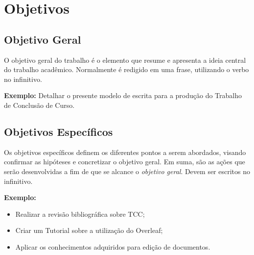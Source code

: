 \chapter{Objetivos}  \label{cap:02}



\section{Objetivo Geral}

O objetivo geral do trabalho é o elemento que resume e apresenta a ideia central do trabalho acadêmico. Normalmente é redigido em uma frase, utilizando o verbo no infinitivo. 

\textbf{Exemplo:} Detalhar o presente modelo de escrita para a produção do Trabalho de Conclusão de Curso.\\

\section{Objetivos Específicos}

Os objetivos específicos definem os diferentes pontos a serem abordados, visando confirmar as hipóteses e concretizar o objetivo geral. Em suma, são as ações que serão desenvolvidas a fim de que se alcance o \textit{objetivo geral}. Devem ser escritos no infinitivo.

\textbf{Exemplo:}

\begin{itemize}
    \item Realizar a revisão bibliográfica sobre TCC;
    \item Criar um Tutorial sobre a utilização do Overleaf;
    \item Aplicar os conhecimentos adquiridos para edição de documentos.
\end{itemize}
